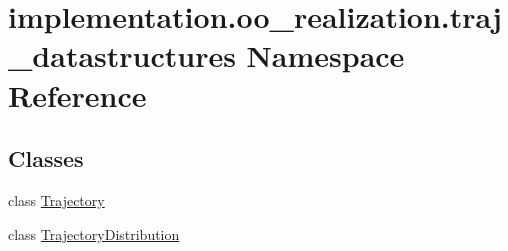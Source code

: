 \hypertarget{namespaceimplementation_1_1oo__realization_1_1traj__datastructures}{}\section{implementation.\+oo\+\_\+realization.\+traj\+\_\+datastructures Namespace Reference}
\label{namespaceimplementation_1_1oo__realization_1_1traj__datastructures}
\subsection*{Classes}
\begin{DoxyCompactItemize}
\item 
class \hyperlink{classimplementation_1_1oo__realization_1_1traj__datastructures_1_1_trajectory}{Trajectory}
\item 
class \hyperlink{classimplementation_1_1oo__realization_1_1traj__datastructures_1_1_trajectory_distribution}{Trajectory\+Distribution}
\end{DoxyCompactItemize}
